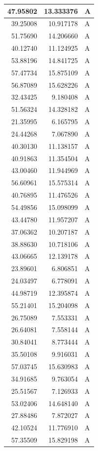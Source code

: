 \documentclass[
  letterpaper,
  DIV=11,
  numbers=noendperiod]{scrartcl}
\begin{document}
\begin{table}
\begin{tabular}[t]{r|r|l}
\hline
47.95802 & 13.333376 & A\\
\hline
39.25008 & 10.917178 & A\\
\hline
51.75690 & 14.206660 & A\\
\hline
40.12740 & 11.124925 & A\\
\hline
53.88196 & 14.841725 & A\\
\hline
57.47734 & 15.875109 & A\\
\hline
56.87089 & 15.628226 & A\\
\hline
32.43425 & 9.180408 & A\\
\hline
51.56324 & 14.328182 & A\\
\hline
21.35995 & 6.165795 & A\\
\hline
24.44268 & 7.067890 & A\\
\hline
40.30130 & 11.138157 & A\\
\hline
40.91863 & 11.354504 & A\\
\hline
43.00460 & 11.944969 & A\\
\hline
56.60961 & 15.575314 & A\\
\hline
40.76895 & 11.476526 & A\\
\hline
54.49856 & 15.098099 & A\\
\hline
43.44780 & 11.957207 & A\\
\hline
37.06362 & 10.207187 & A\\
\hline
38.88630 & 10.718106 & A\\
\hline
43.06665 & 12.139178 & A\\
\hline
23.89601 & 6.806851 & A\\
\hline
24.03497 & 6.778091 & A\\
\hline
44.98719 & 12.395874 & A\\
\hline
55.21401 & 15.204098 & A\\
\hline
26.75089 & 7.553331 & A\\
\hline
26.64081 & 7.558144 & A\\
\hline
30.84041 & 8.773444 & A\\
\hline
35.50108 & 9.916031 & A\\
\hline
57.03745 & 15.630983 & A\\
\hline
34.91685 & 9.763054 & A\\
\hline
25.51567 & 7.126933 & A\\
\hline
53.02406 & 14.648140 & A\\
\hline
27.88486 & 7.872027 & A\\
\hline
42.10524 & 11.776910 & A\\
\hline
57.35509 & 15.829198 & A\\

\end{tabular}
\end{table}
\end{document}
